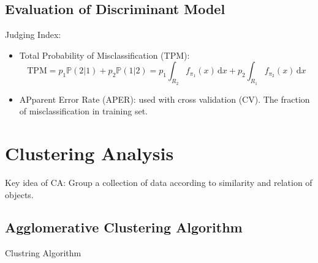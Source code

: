     
        
\subsection{Evaluation of Discriminant Model}
\begin{point}
    Judging Index:
\end{point}

\begin{itemize}[topsep=2pt,itemsep=2pt]
    \item Total Probability of Misclassification (TPM):
    \begin{equation}
        \mathrm{TPM}=p_1\mathbb{P}(2|1)+p_2\mathbb{P}(1|2)=p_1\int _{R_2}f_{\pi_1}(x) \,\mathrm{d}x+p_2\int _{R_1}f_{\pi_2}(x) \,\mathrm{d}x
    \end{equation}
    
    \item APparent Error Rate (APER): used with cross validation (CV). The fraction of misclassification in training set. 
    
\end{itemize}

    
    
    




\section{Clustering Analysis}\label{SubSectionClusteringAnalysis}
    Key idea of CA: Group a collection of data according to  similarity and relation of objects.

\subsection{Agglomerative Clustering Algorithm}

\begin{point}
    Clustring Algorithm
\end{point}

